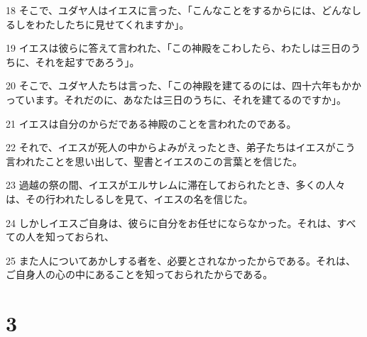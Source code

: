 \par 18 そこで、ユダヤ人はイエスに言った、「こんなことをするからには、どんなしるしをわたしたちに見せてくれますか」。
\par 19 イエスは彼らに答えて言われた、「この神殿をこわしたら、わたしは三日のうちに、それを起すであろう」。
\par 20 そこで、ユダヤ人たちは言った、「この神殿を建てるのには、四十六年もかかっています。それだのに、あなたは三日のうちに、それを建てるのですか」。
\par 21 イエスは自分のからだである神殿のことを言われたのである。
\par 22 それで、イエスが死人の中からよみがえったとき、弟子たちはイエスがこう言われたことを思い出して、聖書とイエスのこの言葉とを信じた。
\par 23 過越の祭の間、イエスがエルサレムに滞在しておられたとき、多くの人々は、その行われたしるしを見て、イエスの名を信じた。
\par 24 しかしイエスご自身は、彼らに自分をお任せにならなかった。それは、すべての人を知っておられ、
\par 25 また人についてあかしする者を、必要とされなかったからである。それは、ご自身人の心の中にあることを知っておられたからである。

\chapter{3}

